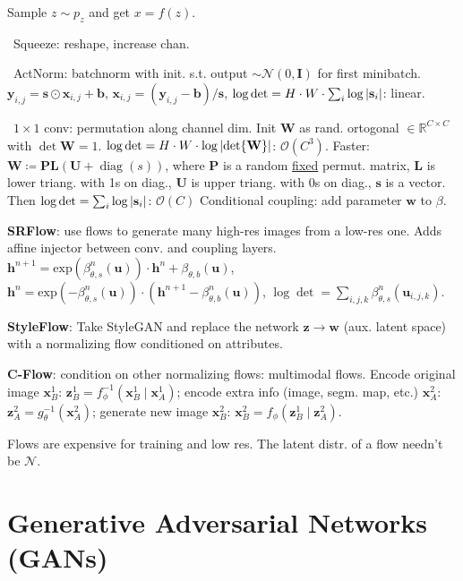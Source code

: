 \documentclass[11pt,landscape,a4paper,fleqn]{article}
\DeclareMathOperator{\diag}{\mathrm{diag}}
\newcommand{\R}{\mathbb{R}}
\renewcommand{\exp}{\mathrm{exp}}
\def\myvector#1{\mathbf{#1}}
\def\vb{{\myvector{b}}}
\def\vh{{\myvector{h}}}
\def\vs{{\myvector{s}}}
\def\vu{{\myvector{u}}}
\def\vw{{\myvector{w}}}
\def\vx{{\myvector{x}}}
\def\vy{{\myvector{y}}}
\def\vz{{\myvector{z}}}
\def\mymatrix#1{\mathbf{#1}}
\def\mI{{\mymatrix{I}}}
\def\mL{{\mymatrix{L}}}
\def\mP{{\mymatrix{P}}}
\def\mU{{\mymatrix{U}}}
\def\mW{{\mymatrix{W}}}
\begin{document}
\begin{multicols*}{4}
Sample $z \sim p_z$ and get $x = f(z)$.

% 

%     
\textbullet\ Squeeze: reshape, increase chan.

\textbullet\ ActNorm: batchnorm with init. s.t. output $\sim \mathcal{N}(0, \mI)$ for first minibatch.
    $\vy_{i,j} = \vs \odot \vx_{i,j} + \vb$,
    $\vx_{i, j} = (\vy_{i,j} - \vb) / \vs$,
    $\log\det = H \cdot W \cdot \sum_i \log \abs{\vs_i}$: linear.

\textbullet\ $1 \times 1$ conv: permutation along channel dim.
    Init $\mW$ as rand. ortogonal $\in \R^{C \times C}$ with $\det\mW = 1$.
    $\log\det = H \cdot W \cdot \log\abs{\det\mW}$: $\mathcal{O}(C^3)$.
    Faster: $\mW \coloneqq \mP \mL(\mU + \diag(s))$,
    where $\mP$ is a random \underline{fixed} permut. matrix,
    $\mL$ is lower triang. with 1s on diag.,
    $\mU$ is upper triang. with 0s on diag.,
    $\vs$ is a vector.
    Then $\log\det = \sum_i \log \abs{\vs_i}$: $\mathcal{O}(C)$
Conditional coupling: add parameter $\vw$ to $\beta$.

\textbf{SRFlow}: use flows to generate many high-res images from a low-res one.
Adds affine injector between conv. and coupling layers.
$\vh^{n+1} = \exp(\beta^n_{\theta, s}(\vu)) \cdot \vh^n + \beta_{\theta, b}(\vu)$,
$\vh^n = \exp( - \beta^n_{\theta, s}(\vu)) \cdot (\vh^{n+1} - \beta^n_{\theta, b}(\vu))$,
$\log\det = \sum_{i,j,k} \beta^n_{\theta, s}(\vu_{i, j, k})$.

\textbf{StyleFlow}: Take StyleGAN and replace the network $\vz \to \vw$ (aux. latent space)
with a normalizing flow conditioned on attributes.

\textbf{C-Flow}: condition on other normalizing flows: multimodal flows.
Encode original image $\vx_B^1$: $\vz_B^1 = f^{-1}_\phi(\vx_B^1 \mid \vx_A^1)$;
encode extra info (image, segm. map, etc.) $\vx_A^2$: $\vz_A^2 = g^{-1}_\theta(\vx_A^2)$;
generate new image $\vx_B^2$: $\vx_B^2 = f_\phi(\vz_B^1 \mid \vz_A^2)$.

Flows are expensive for training and low res.
The latent distr. of a flow needn't be $\mathcal{N}$.

\section{Generative Adversarial Networks (GANs)}


\end{multicols*}
\end{document}
